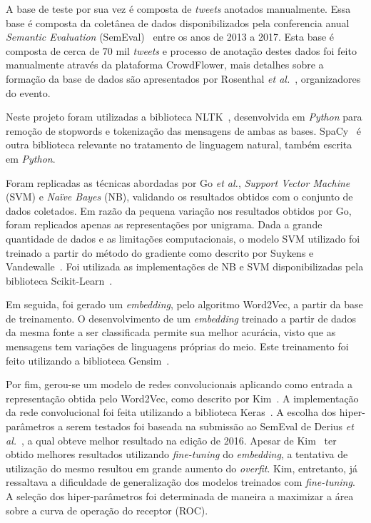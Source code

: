 A base de teste por sua vez é composta de \textit{tweets} anotados manualmente.
Essa base é composta da coletânea de dados disponibilizados pela conferencia anual \textit{Semantic Evaluation}
(SemEval)~\cite{semeval17} entre os anos de 2013 a 2017.
Esta base é composta de cerca de 70 mil \textit{tweets} e processo de anotação destes dados foi feito manualmente através
da plataforma CrowdFlower, mais detalhes sobre a formação da base de dados são apresentados por Rosenthal
\textit{et al.}~\cite{rosenthal17}, organizadores do evento.

Neste projeto foram utilizadas a biblioteca NLTK~\cite{nltk}, desenvolvida em \textit{Python} para remoção de stopwords
e tokenização das mensagens de ambas as bases.
SpaCy~\cite{spacy} é outra biblioteca relevante no tratamento de linguagem natural, também escrita em \textit{Python}.

Foram replicadas as técnicas abordadas por Go \textit{et al.}, \textit{Support Vector Machine} (SVM) e
\textit{Naïve Bayes} (NB), validando os resultados obtidos com o conjunto de dados coletados.
Em razão da pequena variação nos resultados obtidos por Go, foram replicados apenas as representações por unigrama.
Dada a grande quantidade de dados e as limitações computacionais, o modelo SVM utilizado foi treinado a partir do método
do gradiente como descrito por Suykens e Vandewalle~\cite{suykens99}.
Foi utilizada as implementações de NB e SVM disponibilizadas pela biblioteca Scikit-Learn~\cite{sklearn}.

Em seguida, foi gerado um \textit{embedding}, pelo algoritmo Word2Vec, a partir da base de treinamento.
O desenvolvimento de um \textit{embedding} treinado a partir de dados da mesma fonte a ser classificada permite sua
melhor acurácia, visto que as mensagens tem variações de linguagens próprias do meio.
Este treinamento foi feito utilizando a biblioteca Gensim~\cite{gensim}.

Por fim, gerou-se um modelo de redes convolucionais aplicando como entrada a representação obtida pelo Word2Vec, como
descrito por Kim~\cite{kim14}.
A implementação da rede convolucional foi feita utilizando a biblioteca Keras~\cite{keras}.
A escolha dos hiper-parâmetros a serem testados foi baseada na submissão ao SemEval de Derius
\textit{et al.}~\cite{deriu16}, a qual obteve melhor resultado na edição de 2016.
Apesar de Kim~\cite{kim14} ter obtido melhores resultados utilizando \textit{fine-tuning} do \textit{embedding}, a
tentativa de utilização do mesmo resultou em grande aumento do \textit{overfit}.
Kim, entretanto, já ressaltava a dificuldade de generalização dos modelos treinados com \textit{fine-tuning}.
A seleção dos hiper-parâmetros foi determinada de maneira a maximizar a área sobre a curva de operação do receptor (ROC).

